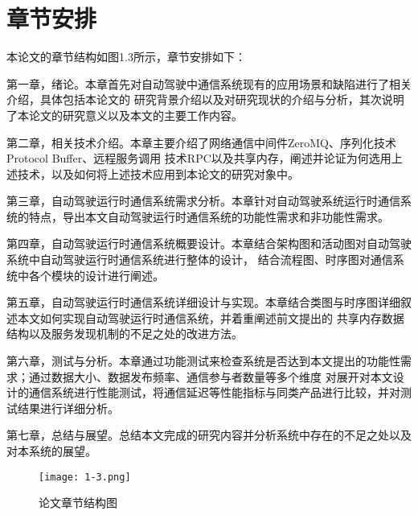 \section{章节安排}
本论文的章节结构如图1.3所示，章节安排如下：

第一章，绪论。本章首先对自动驾驶中通信系统现有的应用场景和缺陷进行了相关介绍，具体包括本论文的
研究背景介绍以及对研究现状的介绍与分析，其次说明了本论文的研究意义以及本文的主要工作内容。

第二章，相关技术介绍。本章主要介绍了网络通信中间件ZeroMQ、序列化技术Protocol Buffer、远程服务调用
技术RPC以及共享内存，阐述并论证为何选用上述技术，以及如何将上述技术应用到本论文的研究对象中。

第三章，自动驾驶运行时通信系统需求分析。本章针对自动驾驶系统运行时通信系统的特点，导出本文自动驾驶运行时通信系统的功能性需求和非功能性需求。

第四章，自动驾驶运行时通信系统概要设计。本章结合架构图和活动图对自动驾驶系统中自动驾驶运行时通信系统进行整体的设计，
结合流程图、时序图对通信系统中各个模块的设计进行阐述。

第五章，自动驾驶运行时通信系统详细设计与实现。本章结合类图与时序图详细叙述本文如何实现自动驾驶运行时通信系统，并着重阐述前文提出的
共享内存数据结构以及服务发现机制的不足之处的改进方法。

第六章，测试与分析。本章通过功能测试来检查系统是否达到本文提出的功能性需求；通过数据大小、数据发布频率、通信参与者数量等多个维度
对展开对本文设计的通信系统进行性能测试，将通信延迟等性能指标与同类产品进行比较，并对测试结果进行详细分析。

第七章，总结与展望。总结本文完成的研究内容并分析系统中存在的不足之处以及对本系统的展望。

\begin{figure}[H]
  \centering
  \texttt{[image: 1-3.png]}
  \caption{论文章节结构图}
  \label{3}
\end{figure}






